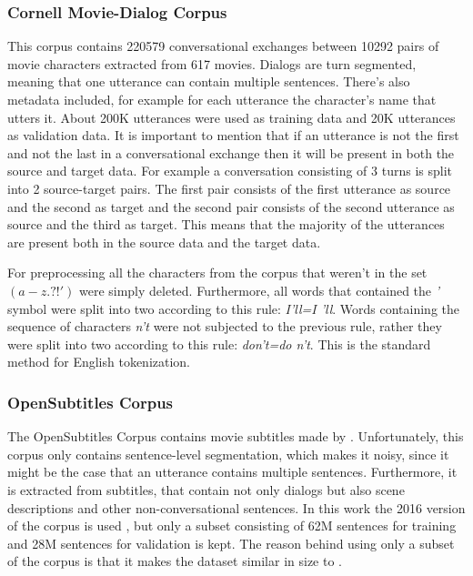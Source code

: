 \documentclass[12pt]{article}
\begin{document}
\subsubsection{Cornell Movie-Dialog Corpus} \label{sssec:cornell}
This corpus contains 220579 conversational exchanges between 10292 pairs of movie characters extracted from 617 movies. Dialogs are turn segmented, meaning that one utterance can contain multiple sentences. There's also metadata included, for example for each utterance the character's name that utters it. About 200K utterances were used as training data and 20K utterances as validation data. It is important to mention that if an utterance is not the first and not the last in a conversational exchange then it will be present in both the source and target data. For example a conversation consisting of 3 turns is split into 2 source-target pairs. The first pair consists of the first utterance as source and the second as target and the second pair consists of the second utterance as source and the third as target. This means that the majority of the utterances are present both in the source data and the target data.

For preprocessing all the characters from the corpus that weren't in the set \((a-z . ? ! ')\) were simply deleted. Furthermore, all words that contained the \textit{'} symbol were split into two according to this rule: \textit{I'll=I 'll}. Words containing the sequence of characters \textit{n't} were not subjected to the previous rule, rather they were split into two according to this rule: \textit{don't=do n't}. This is the standard method for English tokenization.

\subsubsection{OpenSubtitles Corpus} \label{sssec:opensubs}
The OpenSubtitles Corpus contains movie subtitles made by \cite{opensubtitles}. Unfortunately, this corpus only contains sentence-level segmentation, which makes it noisy, since it might be the case that an utterance contains multiple sentences. Furthermore, it is extracted from subtitles, that contain not only dialogs but also scene descriptions and other non-conversational sentences. In this work the 2016 version of the corpus is used \cite{OpenSubtitles:2016}, but only a subset consisting of 62M sentences for training and 28M sentences for validation is kept. The reason behind using only a subset of the corpus is that it makes the dataset similar in size to \cite{Vinyals:2015}.
\end{document}
